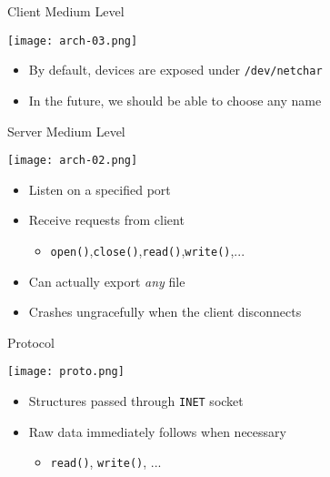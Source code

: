 \documentclass[xcolor=dvipsnames]{beamer}
\begin{document}
\begin{frame}[c]{Client Medium Level}
  \begin{center}
    \texttt{[image: arch-03.png]}
  \end{center}

  \begin{itemize}
    \item<1-> By default, devices are exposed under \texttt{/dev/netchar}
    \item<2-> In the future, we should be able to choose any name
  \end{itemize}
\end{frame}

\begin{frame}[c]{Server Medium Level}
  \begin{center}
    \texttt{[image: arch-02.png]}
  \end{center}
  \begin{itemize}
    \item<1-> Listen on a specified port
    \item<2-> Receive requests from client
    \begin{itemize}
      \item<2-> \texttt{open()},\texttt{close()},\texttt{read()},\texttt{write()},...
    \end{itemize}
    \item<3-> Can actually export \textit{any} file
    \item<4-> Crashes ungracefully when the client disconnects
  \end{itemize}
\end{frame}

\begin{frame}[c]{Protocol}
  \begin{center}
    \texttt{[image: proto.png]}
  \end{center}

  \begin{itemize}
    \item<1-> Structures passed through \texttt{INET} socket
    \item<2-> Raw data immediately follows when necessary
    \begin{itemize}
      \item<2-> \texttt{read()}, \texttt{write()}, ...
    \end{itemize}
  \end{itemize}
\end{frame}
\end{document}
